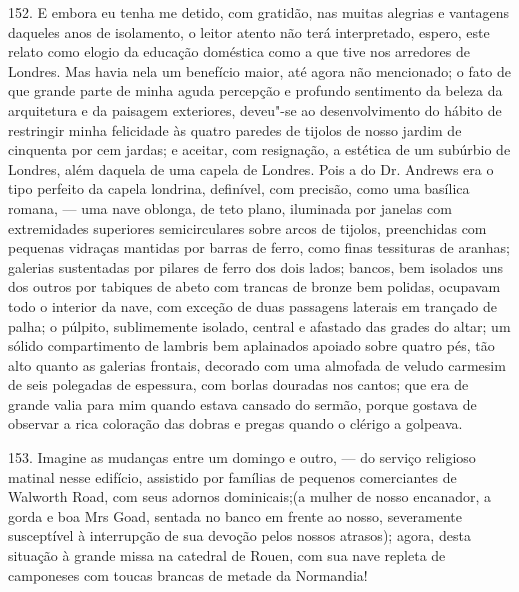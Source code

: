 152. E embora eu tenha me detido, com gratidão, nas muitas alegrias e
vantagens daqueles anos de isolamento, o leitor atento não terá
interpretado, espero, este relato como elogio da educação doméstica como
a que tive nos arredores de Londres. Mas havia nela um benefício maior,
até agora não mencionado; o fato de que grande parte de minha aguda
percepção e profundo sentimento da beleza da arquitetura e da paisagem
exteriores, deveu"-se ao desenvolvimento do hábito de restringir minha
felicidade às quatro paredes de tijolos de nosso jardim de cinquenta por
cem jardas; e aceitar, com resignação, a estética de um subúrbio de
Londres, além daquela de uma capela de Londres. Pois a do Dr. Andrews
era o tipo perfeito da capela londrina, definível, com precisão, como
uma basílica romana, --- uma nave oblonga, de teto plano, iluminada por
janelas com extremidades superiores semicirculares sobre arcos de
tijolos, preenchidas com pequenas vidraças mantidas por barras de ferro,
como finas tessituras de aranhas; galerias sustentadas por pilares de
ferro dos dois lados; bancos, bem isolados uns dos outros por tabiques
de abeto com trancas de bronze bem polidas, ocupavam todo o interior da
nave, com exceção de duas passagens laterais em trançado de palha; o
púlpito, sublimemente isolado, central e afastado das grades do altar;
um sólido compartimento de lambris bem aplainados apoiado sobre quatro
pés, tão alto quanto as galerias frontais, decorado com uma almofada de
veludo carmesim de seis polegadas de espessura, com borlas douradas nos
cantos; que era de grande valia para mim quando estava cansado do
sermão, porque gostava de observar a rica coloração das dobras e pregas
quando o clérigo a golpeava.

153. Imagine as mudanças entre um domingo e outro, --- do serviço
religioso matinal nesse edifício, assistido por famílias de pequenos
comerciantes de Walworth Road, com seus adornos dominicais;(a mulher de
nosso encanador, a gorda e boa Mrs Goad, sentada no banco em frente ao
nosso, severamente susceptível à interrupção de sua devoção pelos nossos
atrasos); agora, desta situação à grande missa na catedral de Rouen, com
sua nave repleta de camponeses com toucas brancas de metade da
Normandia!

